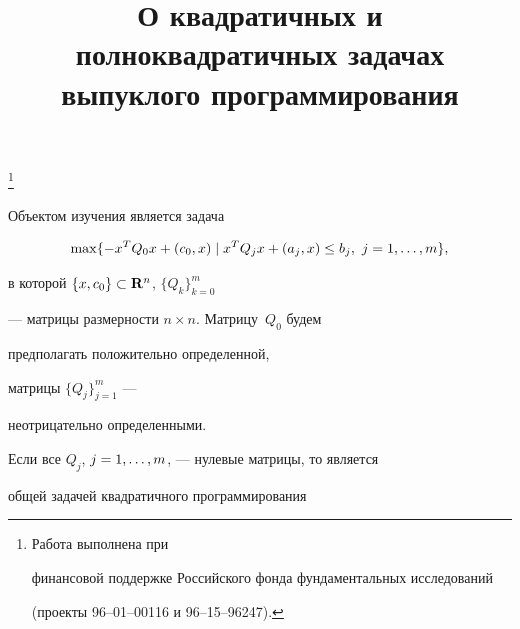\title{О квадратичных и полноквадратичных задачах\\


выпуклого программирования}





\thanks{Работа выполнена при


финансовой поддержке Российского фонда фундаментальных исследований


(проекты 96--01--00116 и 96--15--96247).}


\date{}







\pagestyle{plain} %













\maketitle


\label{begin}








Объектом изучения является задача


\begin{equation}


\label{f1}


\max \{ -x^T Q_0 x +(c_0, x) \mid x^T Q_j x +(a_j, x) \le b_j, \


j=\ij{m} \},


\end{equation}


в которой $\{x,c_0\}\subset\bold R^n$, $\{Q_k\}_{k=0}^m$


--- матрицы размерности $n\times n$. Матрицу~$Q_0$ будем


предполагать положительно определенной,


матрицы $\{ Q_j \}_{j=1}^m$ ---


неотрицательно определенными.


Если все $Q_j$, $j=1,\dotsc,m$, --- нулевые матрицы, то  является


общей задачей квадратичного программирования


